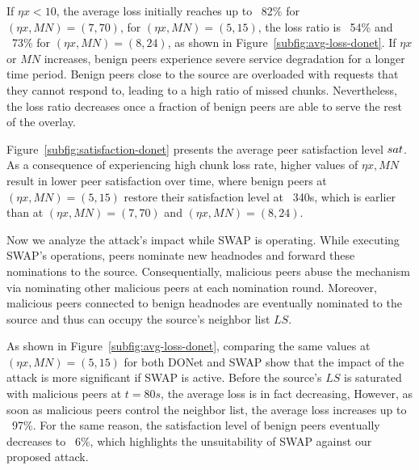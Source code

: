 If $\eta x < 10$, the average loss initially reaches up to ~82\% for $(\eta x, MN)=(7, 70)$, for $(\eta x, MN)=(5, 15)$, the loss ratio is ~54\% and ~73\% for $(\eta x, MN)=(8, 24)$, as shown in Figure~\ref{subfig:avg-loss-donet}.
If $\eta x$ or $MN$ increases, benign peers experience severe service degradation for a longer time period. 
Benign peers close to the source are overloaded with requests that they cannot respond to, leading to a high ratio of missed chunks. 
Nevertheless, the loss ratio decreases once a fraction of benign peers are able to serve the rest of the overlay.

Figure~\ref{subfig:satisfaction-donet} presents the average peer satisfaction level $sat$.
As a consequence of experiencing high chunk loss rate, higher values of $\eta x, MN$ result in lower peer satisfaction over time, where benign peers at $(\eta x, MN)=(5, 15)$ restore their satisfaction level at ~340s, which is earlier than at $(\eta x, MN)=(7, 70)$ and $(\eta x, MN)=(8, 24)$.

Now we analyze the attack's impact while SWAP is operating.
While executing SWAP's operations, peers nominate new headnodes and forward these nominations to the source. 
Consequentially, malicious peers abuse the mechanism via nominating other malicious peers at each nomination round. 
Moreover, malicious peers connected to benign headnodes are eventually nominated to the source and thus can occupy the source's neighbor list $LS$. 

As shown in Figure~\ref{subfig:avg-loss-donet}, comparing the same values at $(\eta x, MN)=(5, 15)$ for both DONet and SWAP show that the impact of the attack is more significant if SWAP is active.
Before the source's $LS$ is saturated with malicious peers at $t=80s$, the average loss is in fact decreasing, However, as soon as malicious peers control the neighbor list, the average loss increases up to ~97\%. 
For the same reason, the satisfaction level of benign peers eventually decreases to ~6\%, which highlights the unsuitability of SWAP against our proposed attack.

